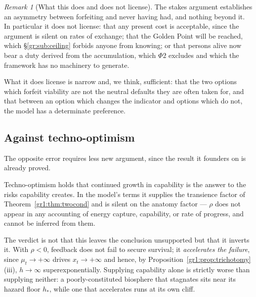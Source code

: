 \documentclass[11pt]{article}
\numberwithin{equation}{section}
\theoremstyle{plain}
\theoremstyle{definition}
\theoremstyle{remark}
\newtheorem{remark}[theorem]{Remark}
\begin{document}
\begin{remark}[What this does and does not license]\label{hr:rem:stakeslimit}
The stakes argument establishes an asymmetry between forfeiting and
never having had, and nothing beyond it. In particular it does not
license: that any present cost is acceptable, since the argument is
silent on rates of exchange; that the Golden Point will be reached,
which \S\ref{gr:sub:ceiling} forbids anyone from knowing; or that
persons alive now bear a duty derived from the accumulation, which
$\Phi2$ excludes and which the framework has no machinery to generate.

What it does license is narrow and, we think, sufficient: that the two
options which forfeit viability are not the neutral defaults they are
often taken for, and that between an option which changes the indicator
and options which do not, the model has a determinate preference.
\end{remark}

\subsection{Against techno-optimism}\label{hr:sub:optimism}

The opposite error requires less new argument, since the result it
founders on is already proved.

Techno-optimism holds that continued growth in capability is the answer
to the risks capability creates. In the model's terms it supplies the
transience factor of Theorem~\ref{gr1:thm:twocond} and is silent on the
anatomy factor --- $\rho$ does not appear in any accounting of energy
capture, capability, or rate of progress, and cannot be inferred from
them.

The verdict is not that this leaves the conclusion unsupported but that
it inverts it. With $\rho<0$, feedback does not fail to secure survival;
it \emph{accelerates the failure}, since $\mu_t\to+\infty$ drives
$x_t\to+\infty$ and hence, by
Proposition~\ref{gr1:prop:trichotomy}(iii), $h\to\infty$
superexponentially. Supplying capability alone is strictly worse than
supplying neither: a poorly-constituted biosphere that stagnates sits
near its hazard floor $h_\ast$, while one that accelerates runs at its
own cliff.
\end{document}
